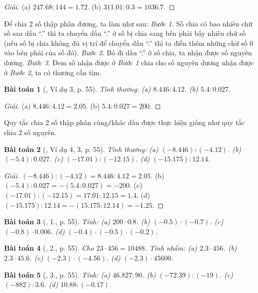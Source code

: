 \documentclass{article}
\newtheorem{baitoan}{Bài toán}
\begin{document}
\begin{proof}[Giải]
	(a) $247.68:144 = 1.72$. (b) $311.01:0.3 = 1036.7$.
\end{proof}
Để chia 2 số thập phân dương, ta làm như sau: \textit{Bước 1.} Số chia có bao nhiêu chữ số sau dấu ``.'' thì ta chuyển dấu ``.'' ở số bị chia sang bên phải bấy nhiêu chữ số (nếu số bị chia không đủ vị trí để chuyển dấu ``.'' thì ta điền thêm những chữ số 0 vào bên phải của số đó). \textit{Bước 2.} Bỏ đi dấu ``.'' ở số chia, ta nhận được số nguyên dương. \textit{Bước 3.} Đem số nhận được ở \textit{Bước 1} chia cho số nguyên dương nhận được ở \textit{Bước 2}, ta có thương cần tìm.

\begin{baitoan}[\cite{SGK_Toan_6_Canh_Dieu_tap_2}, Ví dụ 3, p. 55]
	Tính thương: (a) $8.446:4.12$. (b) $5.4:0.027$.
\end{baitoan}

\begin{proof}[Giải]
	(a) $8.446:4.12 = 2.05$. (b) $5.4:0.027 = 200$.
\end{proof}
Quy tắc chia 2 số thập phân cùng\texttt{/}khác dấu được thực hiện giống như quy tắc chia 2 số nguyên.

\begin{baitoan}[\cite{SGK_Toan_6_Canh_Dieu_tap_2}, Ví dụ 4, 3, p. 55]
	Tính thương: (a) $(-8.446):(-4.12)$. (b) $(-5.4):0.027$. (c) $(-17.01):(-12.15)$. (d) $(-15.175):12.14$.
\end{baitoan}

\begin{proof}[Giải]
	$(-8.446):(-4.12) = 8.446:4.12 = 2.05$. (b) $(-5.4):0.027 = -(5.4:0.027) = -200$. (c) $(-17.01):(-12.15) = 17.01:12.15 = 1.4$. (d) $(-15.175):12.14 = -(15.175:12.14) = -1.25$.
\end{proof}

\begin{baitoan}[\cite{SGK_Toan_6_Canh_Dieu_tap_2}, 1., p. 55]
	Tính: (a) $200\cdot0.8$. (b) $(-0.5)\cdot(-0.7)$. (c) $(-0.8)\cdot0.006$. (d) $(-0.4)\cdot(-0.5)\cdot(-0.2)$.
\end{baitoan}

\begin{baitoan}[\cite{SGK_Toan_6_Canh_Dieu_tap_2}, 2., p. 55]
	Cho $23\cdot456 = 10488$. Tính nhẩm: (a) $2.3\cdot456$. (b) $2.3\cdot45.6$. (c) $(-2.3)\cdot(-4.56)$. (d) $(-2.3)\cdot45600$.
\end{baitoan}

\begin{baitoan}[\cite{SGK_Toan_6_Canh_Dieu_tap_2}, 3., p. 55]
	Tính: (a) $46.827:90$. (b) $(-72.39):(-19)$. (c) $(-882):3.6$. (d) $10.88:(-0.17)$.
\end{baitoan}
\end{document}
